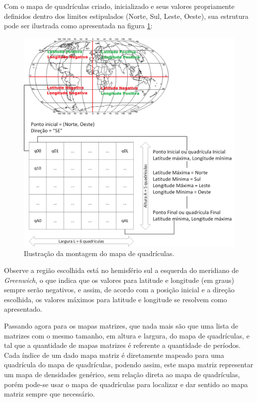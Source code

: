 Com o mapa de quadrículas criado, inicializado e seus valores propriamente definidos dentro dos limites estipulados (Norte, Sul, Leste, Oeste), sua estrutura pode ser ilustrada como apresentada na figura \ref{fig:Ilustrations-QuadricMap}: 


\begin{figure}[h]
	\centering
	\includegraphics[scale=0.6]{Figuras/Ilustrations-QuadricMap.png}
	\caption{Ilustração da montagem do mapa de quadrículas.}
	\label{fig:Ilustrations-QuadricMap}
\end{figure}


Observe a região escolhida está no hemisfério sul a esquerda do meridiano de \emph{Greenwich}, o que indica que os valores para latitude e longitude (em graus) sempre serão negativos, e assim, de acordo com a posição inicial e a direção escolhida, os valores máximos para latitude e longitude se resolvem como apresentado.

Passando agora para os mapas matrizes, que nada mais são que uma lista de matrizes com o mesmo tamanho, em altura e largura, do mapa de quadrículas, e tal que a quantidade de mapas matrizes é referente a quantidade de períodos. Cada índice de um dado mapa matriz é diretamente mapeado para uma quadrícula do mapa de quadrículas, podendo assim, este mapa matriz representar um mapa de densidades genérico, sem relação direta ao mapa de quadrículas, porém pode-se usar o mapa de quadrículas para localizar e dar sentido ao mapa matriz sempre que necessário. 

